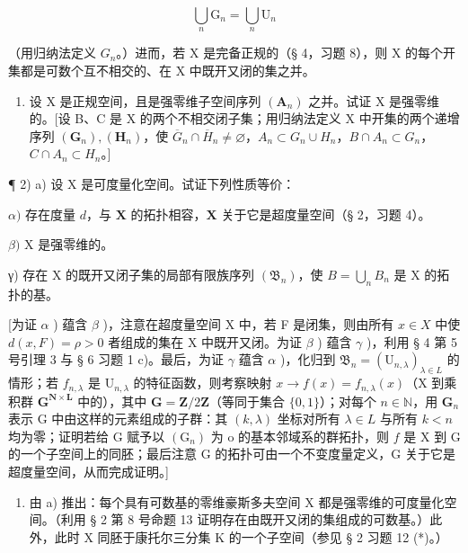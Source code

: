 \[
\bigcup_ {n} \mathrm{G} _ {n} = \bigcup_ {n} \mathrm{U} _ {n}
\]

（用归纳法定义 \(G_{n}\)。）进而，若 X 是完备正规的（§ 4，习题 8），则 X 的每个开集都是可数个互不相交的、在 X 中既开又闭的集之并。

\begin{enumerate}
\def\labelenumi{\alph{enumi})}
\setcounter{enumi}{3}
\tightlist
\item
  设 X 是正规空间，且是强零维子空间序列 \((\mathbf{A}_{n})\) 之并。试证 X 是强零维的。{[}设 B、C 是 X 的两个不相交闭子集；用归纳法定义 X 中开集的两个递增序列 \((\mathbf{G}_{n}), (\mathbf{H}_{n})\)，使 \(\overline{G}_{n} \cap \overline{H}_{n} \neq \varnothing\)，\(A_{n} \subset G_{n} \cup H_{n}\)，\(B \cap A_{n} \subset G_{n}\)，\(C \cap A_{n} \subset H_{n}\)。{]}
\end{enumerate}

¶ 2) a) 设 X 是可度量化空间。试证下列性质等价：

\(\alpha)\) 存在度量 \(d\)，与 \(\mathbf{X}\) 的拓扑相容，\(\mathbf{X}\) 关于它是超度量空间（§ 2，习题 4）。

\(\beta)\) X 是强零维的。

γ) 存在 X 的既开又闭子集的局部有限族序列 \((\mathfrak{B}_{n})\)，使 \(B = \bigcup_{n} B_{n}\) 是 X 的拓扑的基。

{[}为证 \(\alpha\) ) 蕴含 \(\beta\) )，注意在超度量空间 X 中，若 F 是闭集，则由所有 \(x \in X\) 中使 \(d(x, F) = \rho > 0\) 者组成的集在 X 中既开又闭。为证 \(\beta\) ) 蕴含 \(\gamma\) )，利用 § 4 第 5 号引理 3 与 § 6 习题 1 c)。最后，为证 \(\gamma\) 蕴含 \(\alpha\) )，化归到 \(\mathfrak{B}_n = (\mathrm{U}_{n,\lambda})_{\lambda \in L}\) 的情形；若 \(f_{n,\lambda}\) 是 \(\mathrm{U}_{n,\lambda}\) 的特征函数，则考察映射 \(x \to f(x) = f_{n,\lambda}(x)\)（X 到乘积群 \(\mathbf{G}^{\mathbf{N} \times \mathbf{L}}\) 中的），其中 \(\mathbf{G} = \mathbf{Z}/2\mathbf{Z}\)（等同于集合 \(\{0, 1\}\)）；对每个 \(n \in \mathbb{N}\)，用 \(\mathbf{G}_n\) 表示 G 中由这样的元素组成的子群：其 \((k, \lambda)\) 坐标对所有 \(\lambda \in L\) 与所有 \(k < n\) 均为零；证明若给 G 赋予以 \((\mathrm{G}_n)\) 为 o 的基本邻域系的群拓扑，则 \(f\) 是 X 到 G 的一个子空间上的同胚；最后注意 G 的拓扑可由一个不变度量定义，G 关于它是超度量空间，从而完成证明。{]}

\begin{enumerate}
\def\labelenumi{\alph{enumi})}
\setcounter{enumi}{1}
\tightlist
\item
  由 a) 推出：每个具有可数基的零维豪斯多夫空间 X 都是强零维的可度量化空间。（利用 § 2 第 8 号命题 13 证明存在由既开又闭的集组成的可数基。）此外，此时 X 同胚于康托尔三分集 K 的一个子空间（参见 § 2 习题 12 (*)。）
\end{enumerate}

